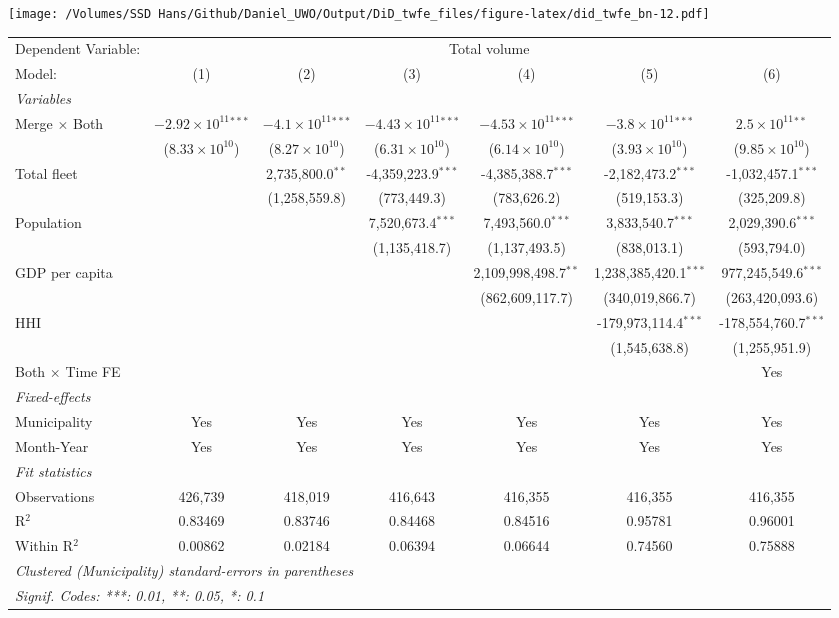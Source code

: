 \documentclass[
]{article}
\begin{document}
\texttt{[image: /Volumes/SSD Hans/Github/Daniel\_UWO/Output/DiD\_twfe\_files/figure-latex/did\_twfe\_bn-12.pdf]}

\begin{tabular}{lcccccc}
\tabularnewline\midrule\midrule
Dependent Variable:&\multicolumn{6}{c}{Total volume}\\
Model:&(1) & (2) & (3) & (4) & (5) & (6)\\
\midrule \emph{Variables}&   &   &   &   &   &  \\
Merge $\times $ Both & $-2.92\times 10^{11}$$^{***}$ & $-4.1\times 10^{11}$$^{***}$ & $-4.43\times 10^{11}$$^{***}$ & $-4.53\times 10^{11}$$^{***}$ & $-3.8\times 10^{11}$$^{***}$ & $2.5\times 10^{11}$$^{**}$\\
  &($8.33\times 10^{10}$) & ($8.27\times 10^{10}$) & ($6.31\times 10^{10}$) & ($6.14\times 10^{10}$) & ($3.93\times 10^{10}$) & ($9.85\times 10^{10}$)\\
Total fleet &    & 2,735,800.0$^{**}$ & -4,359,223.9$^{***}$ & -4,385,388.7$^{***}$ & -2,182,473.2$^{***}$ & -1,032,457.1$^{***}$\\
  &   & (1,258,559.8) & (773,449.3) & (783,626.2) & (519,153.3) & (325,209.8)\\
Population &    &    & 7,520,673.4$^{***}$ & 7,493,560.0$^{***}$ & 3,833,540.7$^{***}$ & 2,029,390.6$^{***}$\\
  &   &    & (1,135,418.7) & (1,137,493.5) & (838,013.1) & (593,794.0)\\
GDP per capita &    &    &    & 2,109,998,498.7$^{**}$ & 1,238,385,420.1$^{***}$ & 977,245,549.6$^{***}$\\
  &   &    &    & (862,609,117.7) & (340,019,866.7) & (263,420,093.6)\\
HHI &    &    &    &    & -179,973,114.4$^{***}$ & -178,554,760.7$^{***}$\\
  &   &    &    &    & (1,545,638.8) & (1,255,951.9)\\
Both $\times$ Time FE &  &  &  &  &  & Yes\\
\midrule \emph{Fixed-effects}&   &   &   &   &   &  \\
Municipality & Yes & Yes & Yes & Yes & Yes & Yes\\
Month-Year & Yes & Yes & Yes & Yes & Yes & Yes\\
\midrule \emph{Fit statistics}&  & & & & & \\
Observations & 426,739&418,019&416,643&416,355&416,355&416,355\\
R$^2$ & 0.83469&0.83746&0.84468&0.84516&0.95781&0.96001\\
Within R$^2$ & 0.00862&0.02184&0.06394&0.06644&0.74560&0.75888\\
\midrule\midrule\multicolumn{7}{l}{\emph{Clustered (Municipality) standard-errors in parentheses}}\\
\multicolumn{7}{l}{\emph{Signif. Codes: ***: 0.01, **: 0.05, *: 0.1}}\\
\end{tabular}
\end{document}
